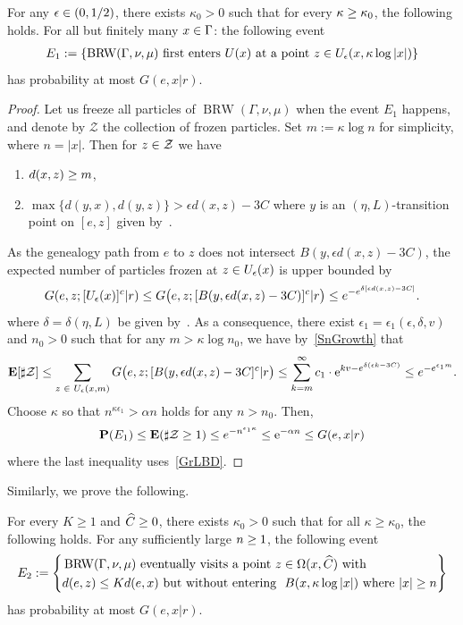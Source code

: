 \documentclass[AHL,Unicode,longabstracts]{cedram}
\newcommand{\rme}{\mathrm{e}}
\newcommand{\bfE}{\mathbf{E}}
\newcommand{\bfP}{\mathbf{P}}
\newcommand{\clZ}{\mathcal{Z}}
\DeclareMathOperator{\BRW}{BRW}
\let\originalleft\left
\let\originalright\right
\renewcommand{\left}{\mathopen{}\mathclose\bgroup\originalleft}
\renewcommand{\right}{\aftergroup\egroup\originalright}
\let\oldin\in
\renewcommand{\in}{\mathchoice{\oldin}{\oldin}{\,\oldin\,}{\,\oldin\,}}
\let\oldge\ge
\renewcommand{\ge}{\mathchoice{\oldge}{\oldge}{\,\oldge\,}{\,\oldge\,}}
\let\oldle\le
\renewcommand{\le}{\mathchoice{\oldle}{\oldle}{\,\oldle\,}{\,\oldle\,}}
\let\oldhat\hat
\renewcommand*{\hat}[1]{\mathchoice{\widehat{#1}}{\widehat{#1}}{\oldhat{#1}}{\oldhat{#1}}}
\begin{document}
\begin{lemm}\label{TraceAvoidTransBall}
For any $\epsilon\in (0,1/2)$, there exists $\kappa_0>0$ such that for every $\kappa\ge \kappa_0$, the following holds. For all but finitely many $x\in \Gamma$: the following event
\begin{align*}
E_1:=\{\BRW(\Gamma,\nu,\mu)~\text{first enters}~U(x)~\text{at a point}~z\in U_{\epsilon}(x,\kappa \log |x|)\}
\end{align*}
has probability at most $G(e,x|r)$.
\end{lemm}

\begin{proof}
Let us freeze all particles of $\BRW(\Gamma,\nu,\mu)$ when the event $E_1$ happens, and denote by $\clZ$ the collection of frozen particles. Set $m:=\kappa \log n$ for simplicity, where $n=|x|$. Then for $z \in \clZ$ we have
\begin{enumerate}
\item $d(x,z)\ge m$,
\item $\max\{d(y,x), d(y,z)\}>\epsilon d(x,z)-3C$ where $y$ is an $(\eta,L)$-transition point on $[e,z]$ given by~\cite[Lemma~6.6]{DWY}.
\end{enumerate}
As the genealogy path from $e$ to $z$ does not intersect $B(y,\epsilon d(x,z)-3C)$, the expected number of particles frozen at $z\in U_\epsilon(x)$ is upper bounded by
\[
G(e,z; [U_\epsilon(x)]^c|r) \le G\bigl(e,z; [B(y,\epsilon d(x,z)-3C)]^c|r\bigr) \le e^{- e^{\delta [\epsilon d(x,z)-3C]}}.
\]
where $\delta=\delta(\eta, L)$ be given by~\cite[Proposition~3.5]{DG21}.
As a consequence, there exist $\epsilon_1=\epsilon_1(\epsilon,\delta,v)$ and $n_0>0$ such that for any $m>\kappa\log n_0$, we have by~\eqref{SnGrowth} that
\[
\bfE[\sharp \clZ]\le \sum_{z\in U_\epsilon(x,m)} G\bigl (e,z; [B(y,\epsilon d(x,z)-3C]^c|r\bigr) \le \sum_{k=m}^{\infty} c_1\cdot \rme^{kv- e^{\delta(\epsilon k-3C)}} \le e^{-e^{\epsilon_1 m}}.
\]
Choose $\kappa$ so that $n^{\kappa \epsilon_1} >\alpha n$ holds for any $n>n_0$. Then,
\[
\bfP(E_1) \le \bfE(\sharp \clZ\ge 1) \le e^{-n^{\epsilon_1\kappa}} \le \rme^{-\alpha n} \le G(e,x|r)
\]
where the last inequality uses~\eqref{GrLBD}.
\end{proof}



Similarly, we prove the following.
\begin{lemm}\label{TraceAvoidTransBall2}
For every $K\geq 1$ and $\hat C\geq 0$, there exists $\kappa_0>0$ such that for all $\kappa\geq \kappa_0$, the following holds. For any sufficiently large $n\ge 1$, the following event
\pagebreak
\[
E_2:=\left\{
\begin{aligned}
&\BRW(\Gamma,\nu,\mu)~\text{eventually visits a point}~z\in \Omega(x,\hat C) \text{ with}\\
& d(e,z)\leq Kd(e,x)\text{ but without entering }~B(x,\kappa \log |x|) \text{ where } |x|\ge n
\end{aligned}
\right\}
\]
has probability at most $G(e,x|r).$
\end{lemm}
\end{document}
